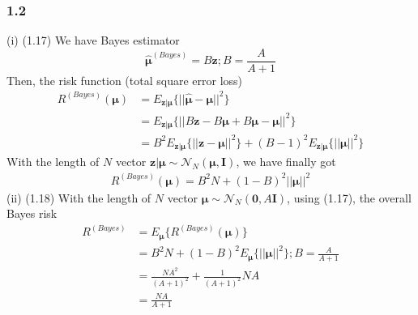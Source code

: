 \documentclass{article}
\begin{document}
\subsubsection*{1.2}
(i) (1.17) \newline
We have Bayes estimator
\begin{displaymath}
\hat{\bm{\mu}}^{(Bayes)} = B\bm{z}; B = \frac{A}{A+1}
\end{displaymath}
Then, the risk function (total square error loss)
\begin{displaymath}
\begin{split}
R^{(Bayes)}(\bm{\mu}) &= E_{\bm{z|\mu}}\{||\hat{\bm{\mu}} - \bm{\mu}||^2\} \\
& = E_{\bm{z|\mu}}\{||B\bm{z} - B\bm{\mu} + B\bm{\mu} - \bm{\mu}||^2\} \\
& = B^2 E_{\bm{z|\mu}}\{||\bm{z} - \bm{\mu}||^2\} + (B-1)^2E_{\bm{z|\mu}}\{||\bm{\mu}||^2\}
\end{split}
\end{displaymath}
With the length of $N$ vector $\bm{z|\mu} \sim \mathcal{N}_N(\bm{\mu},\bm{I})$, we have finally got
\begin{displaymath}
\begin{split}
R^{(Bayes)}(\bm{\mu}) = B^2 N + (1-B)^2 ||\bm{\mu}||^2
\end{split}
\end{displaymath}
(ii) (1.18) \newline
With the length of $N$ vector $\bm{\mu} \sim \mathcal{N}_N(\bm{0},
A\bm{I})$, using (1.17), the overall Bayes risk
\begin{displaymath}
\begin{split}
R^{(Bayes)} & = E_{\bm{\mu}}\{ R^{(Bayes)}(\bm{\mu}) \} \\
& = B^2 N + (1-B)^2 E_{\bm{\mu}} \{||\bm{\mu}||^2\}; B=\frac{A}{A+1} \\
& = \frac{NA^2}{(A+1)^2} + \frac{1}{(A+1)^2} NA \\
& = \frac{NA}{A+1}
\end{split}
\end{displaymath}
\end{document}
